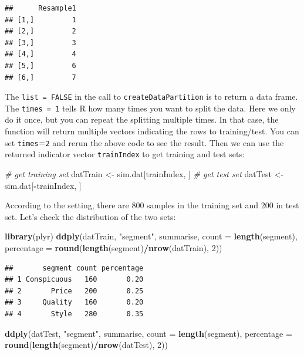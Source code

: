 \documentclass[12pt,]{krantz}
\makeatletter
\newenvironment{Shaded}{\begin{snugshade}}{\end{snugshade}}
\newcommand{\CommentTok}[1]{\textcolor[rgb]{0.37,0.37,0.37}{\textit{#1}}}
\newcommand{\DataTypeTok}[1]{\textcolor[rgb]{0.27,0.27,0.27}{#1}}
\newcommand{\DecValTok}[1]{\textcolor[rgb]{0.06,0.06,0.06}{#1}}
\newcommand{\KeywordTok}[1]{\textcolor[rgb]{0.27,0.27,0.27}{\textbf{#1}}}
\newcommand{\NormalTok}[1]{#1}
\newcommand{\OperatorTok}[1]{\textcolor[rgb]{0.43,0.43,0.43}{\textbf{#1}}}
\newcommand{\StringTok}[1]{\textcolor[rgb]{0.5,0.5,0.5}{#1}}
\newenvironment{kframe}{%
\medskip{}
\setlength{\fboxsep}{.8em}
 \def\at@end@of@kframe{}%
 \ifinner\ifhmode%
  \def\at@end@of@kframe{\end{minipage}}%
  \begin{minipage}{\columnwidth}%
 \fi\fi%
 \def\FrameCommand##1{\hskip\@totalleftmargin \hskip-\fboxsep
 \colorbox{shadecolor}{##1}\hskip-\fboxsep
     \hskip-\linewidth \hskip-\@totalleftmargin \hskip\columnwidth}%
 \MakeFramed {\advance\hsize-\width
   \@totalleftmargin\z@ \linewidth\hsize
   \@setminipage}}%
 {\par\unskip\endMakeFramed%
 \at@end@of@kframe}
\renewenvironment{Shaded}{\begin{kframe}}{\end{kframe}}
\makeatother
\begin{document}
\begin{verbatim}
##      Resample1
## [1,]         1
## [2,]         2
## [3,]         3
## [4,]         4
## [5,]         6
## [6,]         7
\end{verbatim}

The \texttt{list\ =\ FALSE} in the call to \texttt{createDataPartition} is to return a data frame. The \texttt{times\ =\ 1} tells R how many times you want to split the data. Here we only do it once, but you can repeat the splitting multiple times. In that case, the function will return multiple vectors indicating the rows to training/test. You can set \texttt{times＝2} and rerun the above code to see the result. Then we can use the returned indicator vector \texttt{trainIndex} to get training and test sets:

\begin{Shaded}
\begin{Highlighting}[]
\CommentTok{# get training set}
\NormalTok{datTrain <-}\StringTok{ }\NormalTok{sim.dat[trainIndex, ]}
\CommentTok{# get test set}
\NormalTok{datTest <-}\StringTok{ }\NormalTok{sim.dat[}\OperatorTok{-}\NormalTok{trainIndex, ]}
\end{Highlighting}
\end{Shaded}

According to the setting, there are 800 samples in the training set and 200 in test set. Let's check the distribution of the two sets:

\begin{Shaded}
\begin{Highlighting}[]
\KeywordTok{library}\NormalTok{(plyr)}
\KeywordTok{ddply}\NormalTok{(datTrain, }\StringTok{"segment"}\NormalTok{, summarise, }\DataTypeTok{count =} \KeywordTok{length}\NormalTok{(segment), }
    \DataTypeTok{percentage =} \KeywordTok{round}\NormalTok{(}\KeywordTok{length}\NormalTok{(segment)}\OperatorTok{/}\KeywordTok{nrow}\NormalTok{(datTrain), }\DecValTok{2}\NormalTok{))}
\end{Highlighting}
\end{Shaded}

\begin{verbatim}
##       segment count percentage
## 1 Conspicuous   160       0.20
## 2       Price   200       0.25
## 3     Quality   160       0.20
## 4       Style   280       0.35
\end{verbatim}

\begin{Shaded}
\begin{Highlighting}[]
\KeywordTok{ddply}\NormalTok{(datTest, }\StringTok{"segment"}\NormalTok{, summarise, }\DataTypeTok{count =} \KeywordTok{length}\NormalTok{(segment), }
    \DataTypeTok{percentage =} \KeywordTok{round}\NormalTok{(}\KeywordTok{length}\NormalTok{(segment)}\OperatorTok{/}\KeywordTok{nrow}\NormalTok{(datTest), }\DecValTok{2}\NormalTok{))}
\end{Highlighting}
\end{Shaded}
\end{document}
